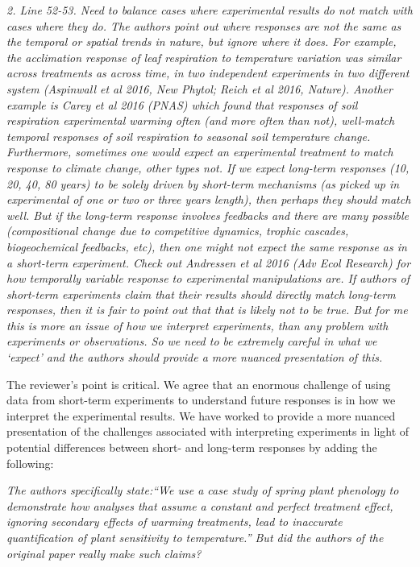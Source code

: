 \documentclass[11pt,a4paper]{letter}
\begin{document}
\begin{letter}{}
\emph{2. Line 52-53. Need to balance cases where experimental results do not match with cases where they do. The authors point out where responses are not the same as the temporal or spatial trends in nature, but ignore where it does. For example, the acclimation response of leaf respiration to temperature variation was similar across treatments as across time, in two independent experiments in two different system (Aspinwall et al 2016, New Phytol; Reich et al 2016, Nature). Another example is Carey et al 2016 (PNAS) which found that responses of soil respiration experimental warming often (and more often than not), well-match temporal responses of soil respiration to seasonal soil temperature change. Furthermore, sometimes one would expect an experimental treatment to match response to climate change, other types not. If we expect long-term responses (10, 20, 40, 80 years) to be solely driven by short-term mechanisms (as picked up in experimental of one or two or three years length), then perhaps they should match well. But if the long-term response involves feedbacks and there are many possible (compositional change due to competitive dynamics, trophic cascades, biogeochemical feedbacks, etc), then one might not expect the same response as in a short-term experiment. Check out Andressen et al 2016 (Adv Ecol Research) for how temporally variable response to experimental manipulations are. If authors of short-term
experiments claim that their results should directly match long-term responses, then it is fair to point out that that is likely not to be true. But for me this is more an issue of how we interpret experiments, than any problem with experiments or observations. So we need to be extremely careful in what we `expect' and the authors should provide a more nuanced presentation of this.}

The reviewer's point is critical. We agree that an enormous challenge of using data from short-term experiments to understand future responses is in how we interpret the experimental results. We have worked to provide a more nuanced presentation of the challenges associated with interpreting experiments in light of potential differences between short- and long-term responses by adding the following:


\emph{The authors specifically state:``We use a case study of spring plant phenology to demonstrate how analyses that assume a constant and perfect treatment effect, ignoring secondary effects of warming treatments, lead to inaccurate quantification of plant sensitivity to temperature.'' But did the authors of the original paper really make such claims?}


\end{letter}
\end{document}
